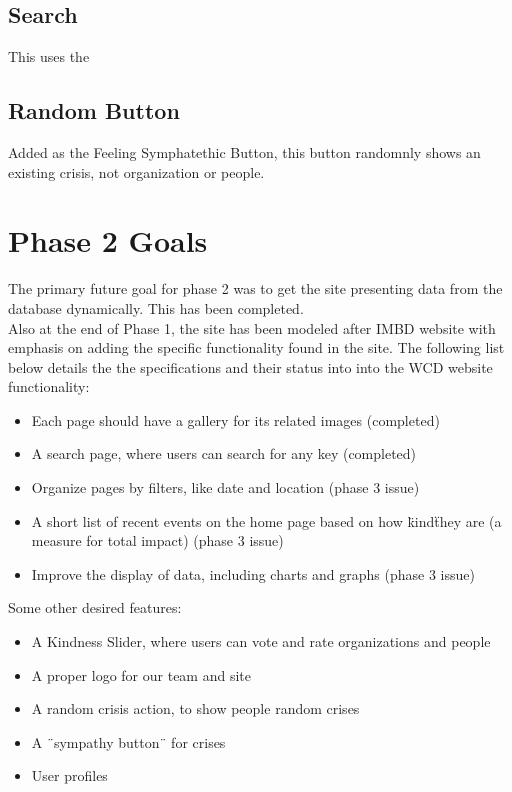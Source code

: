 \documentclass[12pt]{report}
\begin{document}
\subsection*{Search}
\hfill

This uses the

\subsection*{Random Button}
\hfill 

Added as the Feeling Symphatethic Button, this button randomnly shows an existing crisis, not organization or people. 

\newpage
\section*{Phase 2 Goals}
\hfill


The primary future goal for phase 2 was to get the site presenting data from the database dynamically. This has been completed.\\ 


Also at the end of Phase 1, the site has been modeled after IMBD website with emphasis on adding the specific functionality found in the site. The following list below details the the specifications and their status into into the WCD website functionality:
\begin{itemize}
\item Each page should have a gallery for its related images (completed)
\item A search page, where users can search for any key (completed)
\item Organize pages by filters, like date and location (phase 3 issue)
\item A short list of recent events on the home page based on how \"kind\" they are (a measure for total impact) (phase 3 issue)
\item Improve the display of data, including charts and graphs (phase 3 issue)
\end{itemize}

\hfill \newline
Some other desired features:
\begin{itemize}
\item A Kindness Slider, where users can vote and rate organizations and people
\item A proper logo for our team and site
\item A random crisis action, to show people random crises
\item A ¨sympathy button¨ for crises
\item User profiles
\end{itemize}
\end{document}
